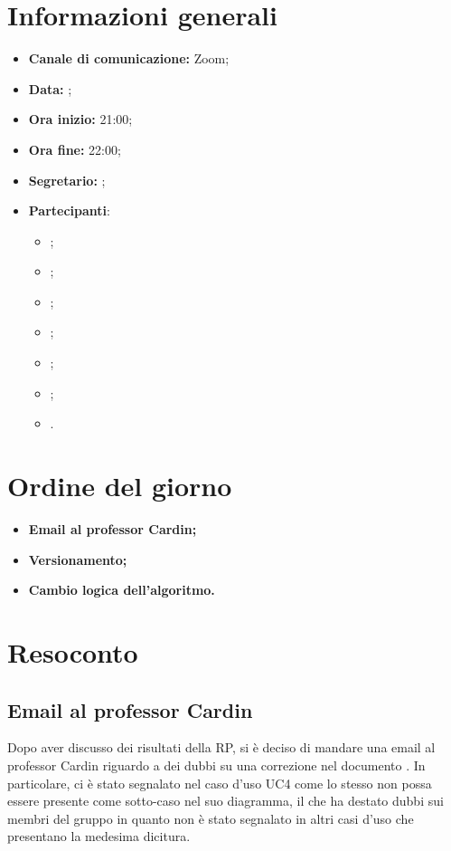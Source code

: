 \section{Informazioni generali}

\begin{itemize}

    \item \textbf{Canale di comunicazione:} Zoom;

    \item \textbf{Data:} \DataMeeting{};

    \item \textbf{Ora inizio:} 21:00;

    \item \textbf{Ora fine:} 22:00;

    \item \textbf{Segretario:} \ACapoRedazione{};

    \item \textbf{Partecipanti}:
        \begin{itemize}
            \item \Daniele{};
            \item \Davide{};
            \item \Francesco{};
            \item \Giosue{};
            \item \Lucrezia{};
            \item \Matteo{};
            \item \Tommaso{}.
        \end{itemize}
\end{itemize}

\section{Ordine del giorno}

\begin{itemize}
    \item\textbf{Email al professor Cardin;}
    \item\textbf{Versionamento;}
    \item\textbf{Cambio logica dell'algoritmo.}
\end{itemize}
\newpage


\section{Resoconto}

\subsection{Email al professor Cardin}
Dopo aver discusso dei risultati della RP, si è deciso di mandare una email al professor Cardin riguardo a dei dubbi su una correzione nel documento \AdR{}.  In particolare, ci è stato segnalato nel caso d'uso UC4 come lo stesso non possa essere presente come sotto-caso nel suo diagramma, il che ha destato dubbi sui membri del gruppo in quanto non è stato segnalato in altri casi d'uso che presentano la medesima dicitura.


